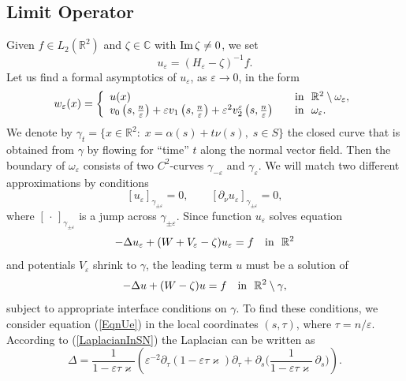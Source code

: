 \documentclass[graybox]{svmult}
\renewcommand{\Im}{\mathop{\rm Im}}
\renewcommand{\kappa}{\varkappa}
\newcommand{\Real}{\mathbb R}
\newcommand{\eps}{\varepsilon}
\newcommand\nep{\textstyle\frac n\eps}
\newcommand{\eqref}[1]{(\ref{#1})}
\begin{document}
\subsection{Limit Operator}
Given $f\in L_2(\Real^2)$ and $\zeta\in \mathbb{C}$ with  $\Im\zeta\neq0$, we set
\begin{equation}\label{Ueps}
u_\eps=(H_\eps-\zeta)^{-1}f.
\end{equation}
Let us find a formal asymptotics of $u_\eps$, as $\eps\to 0$, in the form
\begin{equation}\label{AsymptoticsUe}
w_\eps(x)=
\left\{
  \begin{array}{ll}
    u(x)&\quad \hbox{in \ }\Real^2\setminus \omega_\eps, \\
    v_0\left(s,\nep\right)+\eps v_1\left(s,\nep\right)+\eps^2 v_2^\eps\left(s,\nep\right)
&\quad \hbox{in \ } \omega_\eps.
  \end{array}
\right.
\end{equation}
We denote by $\gamma_t=\{x\in\Real^2\colon\; x=\alpha(s)+t\nu(s), \; s\in S\}$ the closed curve that is obtained from $\gamma$ by flowing for ``time'' $t$ along the normal vector field. Then the boundary of $\omega_\eps$ consists of two $C^2$-curves $\gamma_{-\eps}$ and $\gamma_{\eps}$.
We will match two different approximations by conditions
\begin{equation}\label{MatchingCnds}
  [u_\eps]_{\gamma_{\pm\eps}}=0, \qquad [\partial_\nu u_\eps]_{\gamma_{\pm\eps}}=0,
\end{equation}
where $[\,\cdot\,]_{\gamma_{\pm\eps}}$ is a jump  across $\gamma_{\pm\eps}$.
Since function $u_\eps$ solves equation
\begin{equation}\label{EqnUe}
-\Delta u_\eps +(W+V_\eps-\zeta) u_\eps= f\quad \hbox{in \ } \Real^2
\end{equation}
and potentials $V_\eps$ shrink to $\gamma$,
the leading term $u$ must be a solution of
$$
-\Delta u+(W-\zeta)u= f \quad \hbox{in \ } \Real^2\setminus \gamma,
$$
subject to appropriate interface conditions on $\gamma$. To find these conditions, we consider equation \eqref{EqnUe} in the local coordinates $(s,\tau)$, where $\tau=n/\eps$.
According to \eqref{LaplacianInSN} the Laplacian
can be written as
\begin{equation}
  \Delta =\frac1{1-\eps \tau\kappa}\left( \eps^{-2}\partial_\tau
(1-\eps \tau\kappa)\partial_\tau +\partial_s
\Big(\frac1{1-\eps \tau\kappa}\,\partial_s\Big)\right).
\end{equation}
\end{document}
